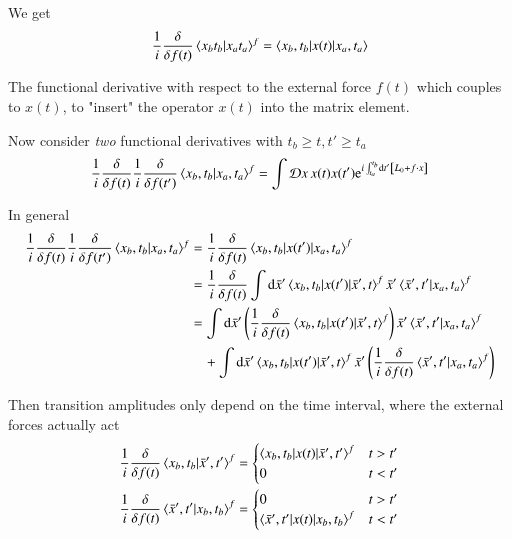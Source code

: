 We get 
\begin{align}
   \frac{1}{i} \frac{\delta}{\delta f(t)} \braket{x_b t_b | x_a t_a}^f 
   = \braket{x_b, t_b | x(t) | x_a, t_a}
\end{align}

The functional derivative with respect to the external force $f(t)$ which couples to $x(t)$, to "insert" the operator $x(t)$ into the matrix element.

Now consider \textit{two} functional derivatives with $t_b \geq t, t' \geq t_a$
\begin{align}
   \frac{1}{i} \frac{\delta}{\delta f(t)} \frac{1}{i} \frac{\delta}{\delta f(t')} \braket{x_b, t_b | x_a, t_a}^f 
   = \int \mathcal{D} x \, x(t) x(t') \mathrm{e}^{i\int^{t_b}_{t_a} \dd{t'} \left[ L_0 + f\cdot x \right]}
\end{align}

In general
\begin{align*}
   \frac{1}{i} \frac{\delta}{\delta f(t)} \frac{1}{i} \frac{\delta}{\delta f(t')} \braket{x_b, t_b | x_a, t_a}^f 
   &= \frac{1}{i} \frac{\delta}{\delta f(t)} \braket{ x_b, t_b | x(t') | x_a, t_a}^f \\
   &= \frac{1}{i} \frac{\delta}{\delta f(t)} \int \dd{\bar{x}'} \braket{ x_b, t_b | x(t') | \bar{x}', t}^f \bar{x}' \braket{\bar{x}', t' | x_a, t_a}^f \\
   &= \int \dd{\bar{x}'} \left(\frac{1}{i} \frac{\delta}{\delta f(t)} \braket{ x_b, t_b | x(t') | \bar{x}', t}^f \right) \bar{x}' \braket{\bar{x}', t' | x_a, t_a}^f  \\
   &\quad + \int \dd{\bar{x}'} \braket{ x_b, t_b | x(t') | \bar{x}', t}^f \bar{x}' \left(\frac{1}{i} \frac{\delta}{\delta f(t)}\braket{\bar{x}', t' | x_a, t_a}^f \right)
\end{align*}

Then transition amplitudes only depend on the time interval, where the external forces actually act
\begin{align*}
   \frac{1}{i} \frac{\delta}{\delta f(t)} \braket{x_b, t_b | \bar{x}', t'}^f &= 
   \begin{cases}
      \braket{x_b, t_b | x(t) | \bar{x}', t'}^f & t > t' \\
      0 & t < t'
   \end{cases} \\
   \frac{1}{i} \frac{\delta}{\delta f(t)} \braket{\bar{x}', t' | x_b, t_b   }^f &= 
   \begin{cases}
      0 & t > t' \\
      \braket{\bar{x}', t' | x(t) | x_b, t_b}^f & t < t'
   \end{cases}
\end{align*}

